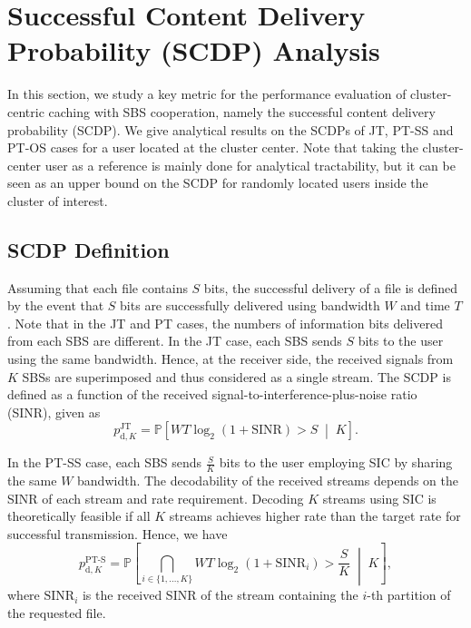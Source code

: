 \documentclass[twocolumns,10pt]{IEEEtran}
\begin{document}
 
\section{Successful Content Delivery Probability (SCDP) Analysis}
\label{SCDP}
In this section, we study a key metric for the performance evaluation of cluster-centric caching with SBS cooperation, namely the successful content delivery probability (SCDP). We give analytical results on the SCDPs of JT, PT-SS and PT-OS cases for a user located at the cluster center. Note that taking the cluster-center user as a reference is mainly done for analytical tractability, but it can be seen as an upper bound on the SCDP for randomly located users inside the cluster of interest. 


\subsection{SCDP Definition}
Assuming that each file contains $S$ bits, the successful delivery of a file is defined by the event that $S$ bits are successfully delivered using bandwidth $W$ and time $T$. Note that in the JT and PT cases, the numbers of information bits delivered from each SBS are different.
In the JT case, each SBS sends $S$ bits to the user using the same bandwidth. Hence, at the receiver side, the received signals from $K$ SBSs are superimposed and thus considered as a single stream. The SCDP is defined as a function of the received signal-to-interference-plus-noise ratio (SINR), given as 
\begin{equation}
p_{\text{d},K}^{\text{JT}}=\mathbb{P}\left[W T\log_2(1+\text{SINR})> S \;\middle|\; K\right].
\end{equation}

In the PT-SS case, each SBS sends $\frac{S}{K}$ bits to the user employing SIC by sharing the same $W$ bandwidth.  The decodability of the received streams depends on the SINR of each stream and rate requirement. 
Decoding $K$ streams using SIC is theoretically feasible if all $K$ streams achieves higher rate than the target rate for successful transmission\cite{SIC}. Hence, we have
\begin{equation}
p_{\text{d},K}^{\text{PT-S}}=\mathbb{P}\left[ \bigcap\limits_{i\in \{1,\ldots, K\}} W T\log_2(1+\text{SINR}_i)> \frac{S}{K} \;\middle|\; K\right],
\end{equation}
where $\text{SINR}_i$ is the received SINR of the stream containing the $i$-th partition of the requested file. 
\end{document}
